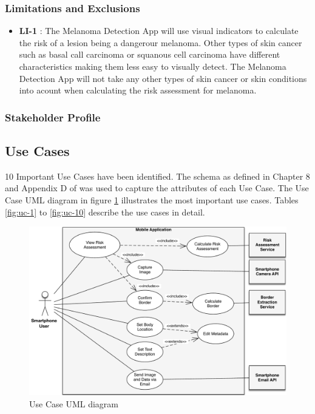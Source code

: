     \subsubsection{Limitations and Exclusions}

        \noindent
        \begin{itemize}[leftmargin=*]
            \item[]  \textbf{LI-1} : The Melanoma Detection App will use visual indicators to calculate the risk of a lesion being a dangerour melanoma. Other types of skin cancer such as basal call carcinoma or squanous cell carcinoma have different characteristics making them less easy to visually detect. The Melanoma Detection App will not take any other types of skin cancer or skin conditions into acount when calculating the risk assessment for melanoma.

        \end{itemize}

    \subsubsection{Stakeholder Profile}


    \subsection{Use Cases}

        10 Important Use Cases have been identified. The schema as defined in Chapter 8 and Appendix D of \cite{wiegers2013software} was used to capture the attributes of each Use Case. The Use Case UML diagram in figure \ref{fig:uml} illustrates the most important use cases. Tables \ref{fig:uc-1} to \ref{fig:uc-10} describe the use cases in detail.

        \begin{figure}[H]
            \centering
            \includegraphics[width=\textwidth]{assets/requirements//uc/UML.pdf}
            \caption{Use Case UML diagram}
            \label{fig:uml}
        \end{figure}

